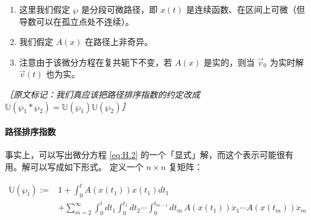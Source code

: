 \begin{enumerate}
  \item 这里我们假定 $\wp$ 是分段可微路径，即 $x(t)$ 是连续函数、在区间上可微（但导数可以在孤立点处不连续）。
  \item 我们假定 $A(x)$ 在路径上非奇异。
  \item 注意由于该微分方程在复共轭下不变，若 $A(x)$ 是实的，则当 $\vec{v}_0$ 为实时解 $\vec{v}(t)$ 也为实。
\end{enumerate}

{\small\itshape ［原文标记：我们真应该把路径排序指数的约定改成
$\mathbb{U}(\wp_1*\wp_2)=\mathbb{U}(\wp_1)\mathbb{U}(\wp_2)$］}



\paragraph{路径排序指数}


事实上，可以写出微分方程 \eqref{eq:H.2} 的一个「显式」解，而这个表示可能很有用。解可以写成如下形式。
定义一个 $n\times n$ 复矩阵：

\begin{equation}
  \begin{aligned}
    \mathbb{U}(\wp_t) := {}& 1 + \int_0^t A(x(t_1))\dot{x}(t_1)dt_1 \\
    &+ \sum_{m=2}^{\infty}\int_0^t dt_1\int_0^{t_1}dt_2\cdots\int_0^{t_{m-1}}dt_m\,
      A(x(t_1))\dot{x}_1\cdots A(x(t_m))\dot{x}_m
  \end{aligned}
  \tag{H.5}
  \label{eq:H.5}
\end{equation}

